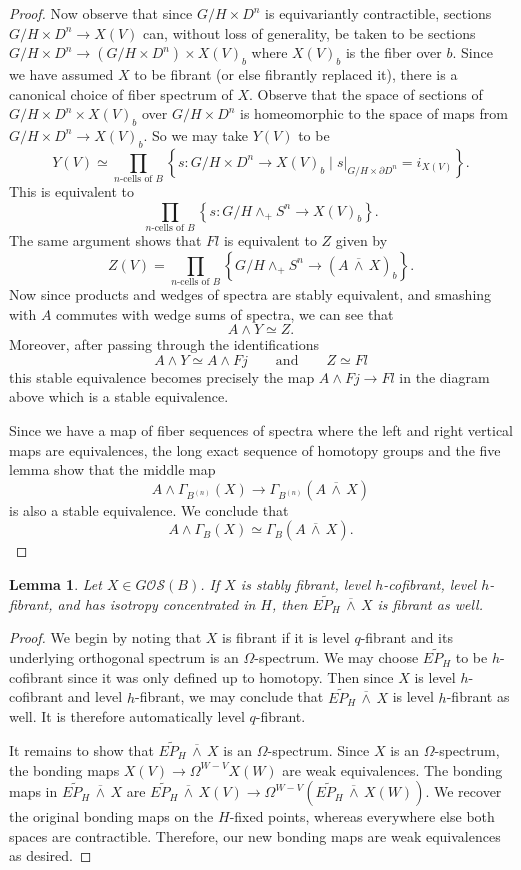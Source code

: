 \documentclass[11pt]{amsart}
\newcommand{\barsmash}{\,\overline\wedge\,}
\newcommand{\Osp}{\mathcal{OS}}
\theoremstyle{plain}   %
\newtheorem{lem}[thm]{Lemma}
\theoremstyle{definition}
\theoremstyle{remark}
\numberwithin{equation}{section}
\begin{document}
\begin{proof}
Now observe that since $G/H\times D^n$ is equivariantly contractible, sections $G/H\times D^n\to X(V)$ can, without loss of generality, be taken to be sections $G/H\times D^n\to (G/H\times D^n)\times X(V)_b$ where $X(V)_b$ is the fiber over $b$. Since we have assumed $X$ to be fibrant (or else fibrantly replaced it), there is a canonical choice of fiber spectrum of $X$. Observe that the space of sections of $G/H\times D^n\times X(V)_b$ over $G/H\times D^n$ is homeomorphic to the space of maps from $G/H\times D^n\to X(V)_b$. So we may take $Y(V)$ to be
\[
Y(V)\simeq \prod_{\text{$n$-cells of $B$}}\left\{ s:G/H\times D^n \to X(V)_b\mid s|_{G/H\times \partial D^n} = i_{X(V)} \right\}.
\]
This is equivalent to 
\[
\prod_{\text{$n$-cells of $B$}}\left\{ s:G/H\wedge_+ S^n \to X(V)_b\right\}.
\]
The same argument shows that $Fl$ is equivalent to $Z$ given by 
\[
Z(V) = \prod_{\text{$n$-cells of $B$}} \left\{ G/H\wedge_+ S^n\to (A\barsmash X)_b \right\}.
\]
Now since products and wedges of spectra are stably equivalent, and smashing with $A$ commutes with wedge sums of spectra, we can see that 
\[
A\wedge Y\simeq Z.
\]
Moreover, after passing through the identifications
\[
A\wedge Y \simeq A\wedge Fj \qquad\text{and}\qquad Z\simeq Fl
\]
this stable equivalence becomes precisely the map $A\wedge Fj\to Fl$ in the diagram above which is a stable equivalence. 

Since we have a map of fiber sequences of spectra where the left and right vertical maps are equivalences, the long exact sequence of homotopy groups and the five lemma show that the middle map 
\[
A \wedge\Gamma_{B^{(n)}}(X)\to \Gamma_{B^{(n)}}(A\barsmash X)
\]
is also a stable equivalence. We conclude that
\[
A\wedge \Gamma_B(X)\simeq \Gamma_B(A\barsmash X).
\]
\end{proof}


\begin{lem}\label{lem:fibrant concentrated isotropy}
Let $X\in G\Osp(B)$. If $X$ is stably fibrant, level $h$-cofibrant, level $h$-fibrant, and has isotropy concentrated in $H$, then $\widetilde{EP_H}\barsmash X$ is fibrant as well.
\end{lem}

\begin{proof}
We begin by noting that $X$ is fibrant if it is level $q$-fibrant and its underlying orthogonal spectrum is an $\Omega$-spectrum. We may choose $\widetilde{EP_H}$ to be $h$-cofibrant since it was only defined up to homotopy. Then since $X$ is level $h$-cofibrant and level $h$-fibrant, we may conclude that $\widetilde{EP_H}\barsmash X$ is level $h$-fibrant as well. It is therefore automatically level $q$-fibrant. 

It remains to show that $\widetilde{EP_H}\barsmash X$ is an $\Omega$-spectrum. Since $X$ is an $\Omega$-spectrum, the bonding maps $X(V)\to \Omega^{W-V}X(W)$ are weak equivalences. The bonding maps in $\widetilde{EP_H}\barsmash X$ are $\widetilde{EP_H}\barsmash X(V) \to \Omega^{W-V}(\widetilde{EP_H}\barsmash X(W))$. We recover the original bonding maps on the $H$-fixed points, whereas everywhere else both spaces are contractible. Therefore, our new bonding maps are weak equivalences as desired. 
\end{proof}
\end{document}
